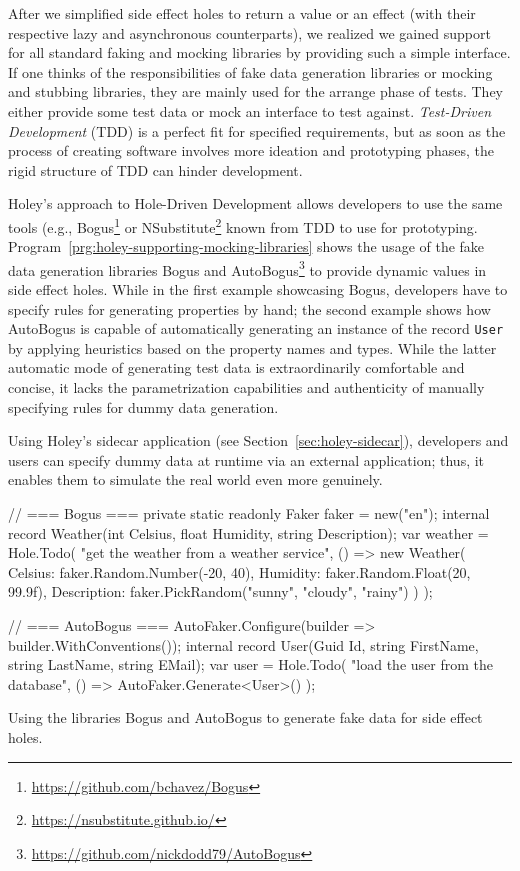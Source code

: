 After we simplified side effect holes to return a value or an effect (with their respective lazy and asynchronous counterparts), we realized we gained support for all standard faking and mocking libraries by providing such a simple interface.
If one thinks of the responsibilities of fake data generation libraries or mocking and stubbing libraries, they are mainly used for the arrange phase of tests.
They either provide some test data or mock an interface to test against.
\emph{Test-Driven Development} (TDD) is a perfect fit for specified requirements, but as soon as the process of creating software involves more ideation and prototyping phases, the rigid structure of TDD can hinder development.

Holey's approach to Hole-Driven Development allows developers to use the same tools (e.g., Bogus\footnote{\url{https://github.com/bchavez/Bogus}} or NSubstitute\footnote{\url{https://nsubstitute.github.io/}} known from TDD to use for prototyping.
Program~\ref{prg:holey-supporting-mocking-libraries} shows the usage of the fake data generation libraries Bogus and AutoBogus\footnote{\url{https://github.com/nickdodd79/AutoBogus}} to provide dynamic values in side effect holes.
While in the first example showcasing Bogus, developers have to specify rules for generating properties by hand; the second example shows how AutoBogus is capable of automatically generating an instance of the record \texttt{User} by applying heuristics based on the property names and types.
While the latter automatic mode of generating test data is extraordinarily comfortable and concise, it lacks the parametrization capabilities and authenticity of manually specifying rules for dummy data generation.

Using Holey's sidecar application (see Section~\ref{sec:holey-sidecar}), developers and users can specify dummy data at runtime via an external application; thus, it enables them to simulate the real world even more genuinely.

\begin{program}[ht]
\begin{CsCode}
// === Bogus ===
private static readonly Faker faker = new("en");
internal record Weather(int Celsius, float Humidity, string Description);
var weather = Hole.Todo(
	"get the weather from a weather service",
	() =>
		new Weather(
			Celsius: faker.Random.Number(-20, 40),
			Humidity: faker.Random.Float(20, 99.9f),
			Description: faker.PickRandom("sunny", "cloudy", "rainy")
		)
);

// === AutoBogus ===
AutoFaker.Configure(builder => builder.WithConventions());
internal record User(Guid Id, string FirstName, string LastName, string EMail);
var user = Hole.Todo(
    "load the user from the database",
    () => AutoFaker.Generate<User>()
);
\end{CsCode}
\caption{Using the libraries Bogus and AutoBogus to generate fake data for side effect holes.}
\label{prg:holey-supporting-mocking-libraries}
\end{program}

